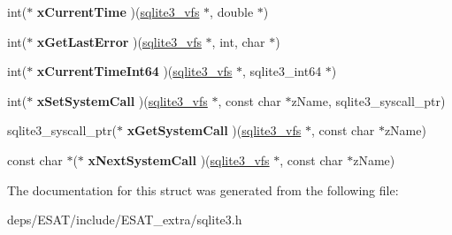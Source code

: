 \begin{DoxyCompactItemize}
\mbox{\label{structsqlite3__vfs_a925aa81bcf67f2daf50ad59de850ef41}} 
int($\ast$ {\bfseries x\+Current\+Time} )(\mbox{\hyperlink{structsqlite3__vfs}{sqlite3\+\_\+vfs}} $\ast$, double $\ast$)
\item 
\mbox{\label{structsqlite3__vfs_ae90895f142cc41801f515ae5e339a3d7}} 
int($\ast$ {\bfseries x\+Get\+Last\+Error} )(\mbox{\hyperlink{structsqlite3__vfs}{sqlite3\+\_\+vfs}} $\ast$, int, char $\ast$)
\item 
\mbox{\label{structsqlite3__vfs_a2a344dbc5e4625343d992546fbff5421}} 
int($\ast$ {\bfseries x\+Current\+Time\+Int64} )(\mbox{\hyperlink{structsqlite3__vfs}{sqlite3\+\_\+vfs}} $\ast$, sqlite3\+\_\+int64 $\ast$)
\item 
\mbox{\label{structsqlite3__vfs_a444cd80f79ea4994f72551bb9f403866}} 
int($\ast$ {\bfseries x\+Set\+System\+Call} )(\mbox{\hyperlink{structsqlite3__vfs}{sqlite3\+\_\+vfs}} $\ast$, const char $\ast$z\+Name, sqlite3\+\_\+syscall\+\_\+ptr)
\item 
\mbox{\label{structsqlite3__vfs_a1bf78a1603ab605cd92d146e3f810727}} 
sqlite3\+\_\+syscall\+\_\+ptr($\ast$ {\bfseries x\+Get\+System\+Call} )(\mbox{\hyperlink{structsqlite3__vfs}{sqlite3\+\_\+vfs}} $\ast$, const char $\ast$z\+Name)
\item 
\mbox{\label{structsqlite3__vfs_afbd158883d9bb7954fa7ecd595fe3c2b}} 
const char $\ast$($\ast$ {\bfseries x\+Next\+System\+Call} )(\mbox{\hyperlink{structsqlite3__vfs}{sqlite3\+\_\+vfs}} $\ast$, const char $\ast$z\+Name)
\end{DoxyCompactItemize}


The documentation for this struct was generated from the following file\+:\begin{DoxyCompactItemize}
\item 
deps/\+E\+S\+A\+T/include/\+E\+S\+A\+T\+\_\+extra/sqlite3.\+h\end{DoxyCompactItemize}
